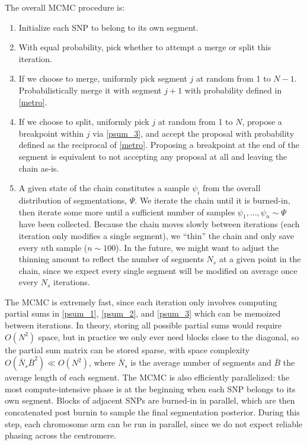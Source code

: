 \documentclass[10pt,letter]{article}
\numberwithin{equation}{section}
\begin{document}
The overall MCMC procedure is:
\begin{enumerate}
\item Initialize each SNP to belong to its own segment.
\item With equal probability, pick whether to attempt a merge or split this iteration.
\item If we choose to merge, uniformly pick segment $j$ at random from 1 to $N-1$. Probabilistically merge it with segment $j+1$ with probability defined in \eqref{metro}.
\item If we choose to split, uniformly pick $j$ at random from 1 to $N$, propose a breakpoint within $j$ via \eqref{psum_3}, and accept the proposal with probability defined as the reciprocal of \eqref{metro}. Proposing a breakpoint at the end of the segment is equivalent to not accepting any proposal at all and leaving the chain as-is.
\item A given state of the chain constitutes a sample $\psi_i$ from the overall distribution of segmentations, $\Psi$. We iterate the chain until it is burned-in, then iterate some more until a sufficient number of samples $\psi_1,\dots,\psi_n\sim\Psi$ have been collected. Because the chain moves slowly between iterations (each iteration only modifies a single segment), we ``thin'' the chain and only save every $n$th sample ($n\sim 100$). In the future, we might want to adjust the thinning amount to reflect the number of segments $N_s$ at a given point in the chain, since we expect every single segment will be modified on average once every $N_s$ iterations.
\end{enumerate}

The MCMC is extremely fast, since each iteration only involves computing partial sums in \eqref{psum_1}, \eqref{psum_2}, and \eqref{psum_3} which can be memoized between iterations. In theory, storing all possible partial sums would require $O(N^2)$ space, but in practice we only ever need blocks close to the diagonal, so the partial sum matrix can be stored sparse, with space complexity $O(\bar{N}_s\bar{B}^2)\ll O(N^2)$, where $\bar{N}_s$ is the average number of segments and $\bar{B}$ the average length of each segment. The MCMC is also efficiently parallelized: the most compute-intensive phase is at the beginning when each SNP belongs to its own segment. Blocks of adjacent SNPs are burned-in in parallel, which are then concatenated post burnin to sample the final segmentation posterior. During this step, each chromosome arm can be run in parallel, since we do not expect reliable phasing across the centromere.
\end{document}
